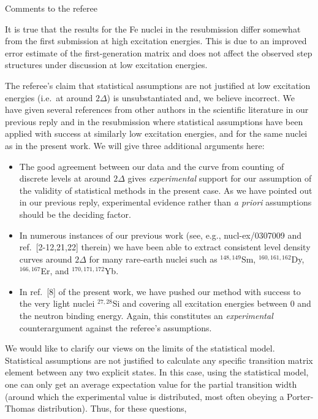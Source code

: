 \documentclass{article}
\begin{document}
\large Comments to the referee\normalsize

\vspace*{0.5cm}
It is true that the results for the Fe nuclei in the resubmission differ 
somewhat from the first submission at high excitation energies. This is due to
an improved error estimate of the first-generation matrix and does not affect 
the observed step structures under discussion at low excitation energies.

The referee's claim that statistical assumptions are not justified at low
excitation energies (i.e.\ at around $2\Delta$) is unsubstantiated and, we 
believe incorrect. We have given several references from other authors in the 
scientific literature in our previous reply and in the resubmission where 
statistical assumptions have been applied with success at similarly low 
excitation energies, and for the same nuclei as in the present work. We will 
give three additional arguments here:
\begin{itemize}
\item The good agreement between our data and the curve from counting of 
discrete levels at around $2\Delta$ gives {\em experimental} support for our
assumption of the validity of statistical methods in the present case. As we 
have pointed out in our previous reply, experimental evidence rather than 
{\em a priori} assumptions should be the deciding factor.
\item In numerous instances of our previous work (see, e.g., nucl-ex/0307009 
and ref.\ [2-12,21,22] therein) we have been able to extract consistent level 
density curves around $2\Delta$ for many rare-earth nuclei such as 
$^{148,149}$Sm, $^{160,161,162}$Dy, $^{166,167}$Er, and $^{170,171,172}$Yb.
\item In ref.\ [8] of the present work, we have pushed our method with success 
to the very light nuclei $^{27,28}$Si and covering all excitation energies 
between 0 and the neutron binding energy. Again, this constitutes an 
{\em experimental} counterargument against the referee's assumptions.
\end{itemize}
We would like to clarify our views on the limits of the statistical model.
Statistical assumptions are not justified to calculate any specific transition 
matrix element between any two explicit states. In this case, using the 
statistical model, one can only get an average expectation value for the 
partial transition width (around which the experimental value is distributed, 
most often obeying a Porter-Thomas distribution). Thus, for these questions,
\end{document}
